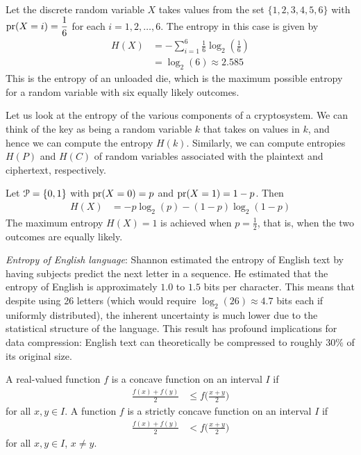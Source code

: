 \documentclass[a4paper, 12pt]{book} %
\begin{document}
\begin{example}
    Let the discrete random variable $X$ takes values from the set $\{1,2,3,4,5,6\}$ with $\operatorname{pr}(X = i) = \dfrac{1}{6}$ for each $i = 1, 2, \ldots, 6$. The entropy in this case is given by 
    \begin{align}
        H(X) &= -\sum_{i=1}^6 \frac{1}{6}\log_2\left(\frac{1}{6}\right) \\
            &= \log_2(6) \approx 2.585
    \end{align}
    This is the entropy of an unloaded die, which is the maximum possible entropy for a random variable with six equally likely outcomes.
\end{example}

Let us look at the entropy of the various components of a cryptosystem. We
can think of the key as being a random variable $k$ that takes on values in $k$, and hence we can compute the entropy $H(k)$. Similarly, we can compute entropies $H(P)$ and $H(C)$ of random variables associated with the plaintext and ciphertext, respectively. 

\begin{example}
    Let $\EuScript{P} = \{0,1\}$ with $\operatorname{pr}(X = 0) = p$ and $\operatorname{pr}(X = 1) = 1 - p$. Then
    \begin{align}
        H(X) &= -p\log_2(p) - (1-p)\log_2(1-p)
    \end{align}
    The maximum entropy $H(X) = 1$ is achieved when $p = \tfrac{1}{2}$, that is, when the two outcomes are equally likely.
\end{example}

\begin{example}
    \emph{Entropy of English language}: Shannon estimated the entropy of English text by having subjects predict the next letter in a sequence. He estimated that the entropy of English is approximately $1.0$ to $1.5$ bits per character. This means that despite using 26 letters (which would require $\log_2(26) \approx 4.7$ bits each if uniformly distributed), the inherent uncertainty is much lower due to the statistical structure of the language. This result has profound implications for data compression: English text can theoretically be compressed to roughly $30\%$ of its original size.
\end{example}


\begin{definition}
    A real-valued function $f$ is a concave function on an interval $I$ if
    \begin{align}
        \frac{f(x) + f(y)}{2} &\leq f \bigg( \frac{x+y}{2} \bigg)
    \end{align}
    for all $x, y \in I$. A function $f$ is a strictly concave function on an interval $I$ if
    \begin{align}
        \frac{f(x) + f(y)}{2} &< f \bigg( \frac{x+y}{2} \bigg)
    \end{align}
    for all $x, y \in I$, $x \neq y$.
\end{definition}
\end{document}
